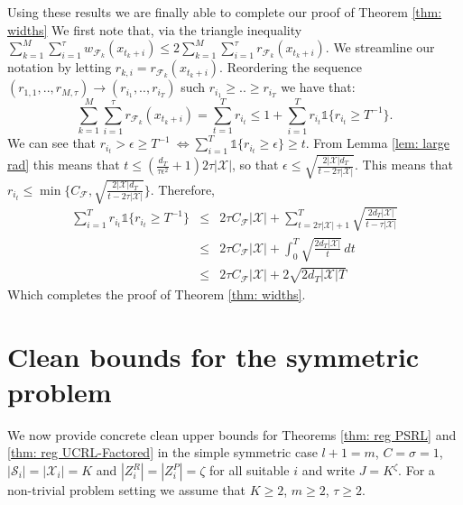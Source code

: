 \documentclass{article}
\newcommand{\Ind}{\mathds{1}}
\newcommand{\Xc}{\mathcal{X}}
\newcommand{\Fc}{\mathcal{F}}
\newcommand{\Sc}{\mathcal{S}}
\begin{document}
Using these results we are finally able to complete our proof of Theorem \ref{thm: widths}
We first note that, via the triangle inequality $ \sum_{k=1}^M \sum_{i=1}^\tau w_{\mathcal{F}_{k}}(x_{t_k+i}) \le 2 \sum_{k=1}^M \sum_{i=1}^\tau r_{\mathcal{F}_{k}}(x_{t_k+i})$.
We streamline our notation by letting $r_{k,i} = r_{\mathcal{F}_{k}}(x_{t_k+i}) $.
Reordering the sequence $(r_{1,1}, .. , r_{M,\tau}) \rightarrow (r_{i_1}, .. ,r_{i_T})$ such $r_{i_1} \ge .. \ge r_{i_T}$ we have that:
$$ \sum_{k=1}^M \sum_{i=1}^\tau r_{\mathcal{F}_{k}}(x_{t_k+i})  = \sum_{t=1}^T r_{i_t} \le 1 + \sum_{i=1}^T r_{i_t} \Ind \{ r_{i_t} \ge T^{-1} \}. $$
We can see that $r_{i_t} > \epsilon \ge T^{-1} \ \iff \sum_{i=1}^T \Ind \{ r_{i_t} \ge \epsilon\} \ge t$.
From Lemma \ref{lem: large rad} this means that $t \le \left( \frac{d_T}{\tau \epsilon^2} + 1 \right) 2\tau |\Xc|$, so that
$\epsilon \le \sqrt{ \frac{2|\Xc| d_T}{t- 2\tau |\Xc|} }$.
This means that $r_{i_t} \le \min \{ C_\Fc , \sqrt{ \frac{2|\Xc| d_T}{t- 2\tau |\Xc|} } \}$.
Therefore,
\begin{eqnarray*}
	\sum_{i=1}^T r_{i_t} \Ind \{ r_{i_t} \ge T^{-1} \}
	&\le& 2\tau C_\Fc |\Xc| + \sum_{t=2\tau |\Xc| +1}^T \sqrt{\frac{2d_T |\Xc|}{t - \tau |\Xc|}} \\
	&\le& 2\tau C_\Fc |\Xc| +  \int_0^T \sqrt{ \frac{2d_T |\Xc|}{t} } \,dt \\
	&\le& 2\tau C_\Fc |\Xc| + 2 \sqrt{2d_T |\Xc| T}
\end{eqnarray*}
Which completes the proof of Theorem \ref{thm: widths}.





\section{Clean bounds for the symmetric problem}
\label{sec: Clean symmetric bounds}
We now provide concrete clean upper bounds for Theorems \ref{thm: reg PSRL} and \ref{thm: reg UCRL-Factored} in the simple symmetric case
$l+1=m$, $C=\sigma=1$, $| \Sc_i | = |\Xc_i | = K$ and $|Z^R_i| = |Z^P_i | = \zeta$ for all suitable $i$ and write $J = K^\zeta$.
For a non-trivial problem setting we assume that $K \ge 2$, $m\ge2$, $\tau \ge 2$.
\end{document}
